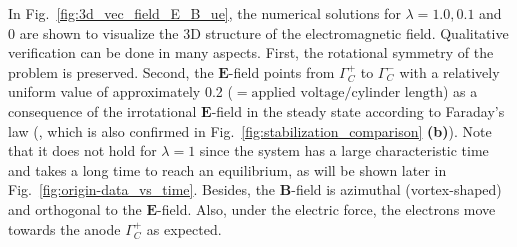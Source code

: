 \documentclass{article}
\begin{document}
In Fig.~\ref{fig:3d_vec_field_E_B_ue}, the numerical solutions for $\lambda = 1.0, 0.1$
and $0$ are shown to visualize the 3D structure of the electromagnetic field. Qualitative
verification can be done in many aspects. First, the rotational symmetry of the problem is
preserved. Second, the $\mathbf{E}$-field points from $\Gamma^+_C$ to $\Gamma^-_C$ with a
relatively uniform value of approximately 0.2
($=\text{applied voltage}/\text{cylinder length}$) as a consequence of the irrotational
$\mathbf{E}$-field in the steady state according to Faraday's law (, which is also confirmed
in Fig.~\ref{fig:stabilization_comparison} \textbf{(b)}). Note that it does not hold for $\lambda = 1$
since the system has a large characteristic time and takes a long time to reach an
equilibrium, as will be shown later in Fig.~\ref{fig:origin-data_vs_time}. Besides, the
$\mathbf{B}$-field is azimuthal (vortex-shaped) and orthogonal to the
$\mathbf{E}$-field. Also, under the electric force, the electrons move towards the anode
$\Gamma^+_C$ as expected.
\end{document}
